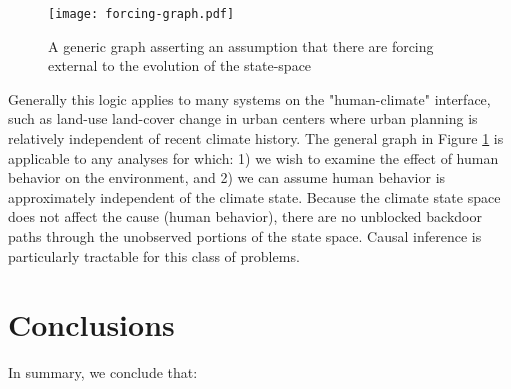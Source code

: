 \documentclass[12pt]{article}
\begin{document}
\begin{figure}
  \texttt{[image: forcing-graph.pdf]}
  \caption{A generic graph asserting an assumption that there are
    forcing external to the evolution of the state-space}
  \label{fig:forcing}
\end{figure}

Generally this logic applies to many systems on the "human-climate"
interface, such as land-use land-cover change in urban centers where
urban planning is relatively independent of recent climate
history. The general graph in Figure \ref{fig:forcing} is applicable
to any analyses for which: 1) we wish to examine the effect of human
behavior on the environment, and 2) we can assume human behavior is
approximately independent of the climate state. Because the climate
state space does not affect the cause (human behavior), there are no
unblocked backdoor paths through the unobserved portions of the state
space. Causal inference is particularly tractable for this class of
problems.

\section{Conclusions}

In summary, we conclude that:
\end{document}
